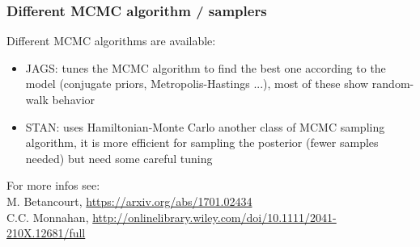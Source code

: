 \documentclass{beamer}
\begin{document}
\begin{frame}
\begin{columns}
   
   
     
   
  \end{columns}

  
  
  
  
  
 \end{frame}



  \begin{frame}
  \frametitle{\bf Different MCMC algorithm / samplers}
  
  Different MCMC algorithms are available:
  
  \begin{itemize}
   \item JAGS: tunes the MCMC algorithm to find the best one according to the model (conjugate priors, Metropolis-Hastings ...), most of these show random-walk behavior
   \item STAN: uses Hamiltonian-Monte Carlo another class of MCMC sampling algorithm, it is more efficient for sampling the posterior (fewer samples needed) but need some careful tuning
  \end{itemize}
  
  For more infos see:\\
  M. Betancourt, \url{https://arxiv.org/abs/1701.02434}\\
  C.C. Monnahan, \url{http://onlinelibrary.wiley.com/doi/10.1111/2041-210X.12681/full}
  

  
 \end{frame}
 
\end{document}
